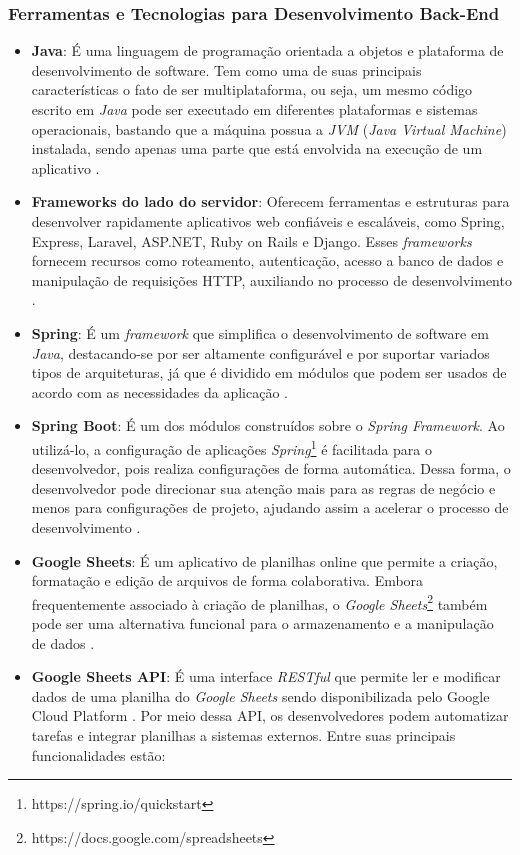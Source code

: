 \subsubsection{Ferramentas e Tecnologias para Desenvolvimento Back-End}

\begin{itemize}
    \item \textbf{Java}: É uma linguagem de programação orientada a objetos e plataforma de desenvolvimento de software. Tem como uma de suas principais características o fato de ser multiplataforma, ou seja, um mesmo código escrito em \textit{Java} pode ser executado em diferentes plataformas e sistemas operacionais, bastando que a máquina possua a \textit{JVM} (\textit{Java Virtual Machine}) instalada, sendo apenas uma parte que está envolvida na execução de um aplicativo \cite{Java2025}.
    \item \textbf{Frameworks do lado do servidor}: Oferecem ferramentas e estruturas para desenvolver rapidamente aplicativos web confiáveis e escaláveis, como Spring, Express, Laravel, ASP.NET, Ruby on Rails e Django. Esses \textit{frameworks} fornecem recursos como roteamento, autenticação, acesso a banco de dados e manipulação de requisições HTTP, auxiliando no processo de desenvolvimento \cite{santiago2020desenvolvimento}.
    \item \textbf{Spring}: É um \textit{framework} que simplifica o desenvolvimento de software em \textit{Java}, destacando-se por ser altamente configurável e por suportar variados tipos de arquiteturas, já que é dividido em módulos que podem ser usados de acordo com as necessidades da aplicação \cite{Spring2025}.
    \item \textbf{Spring Boot}: É um dos módulos construídos sobre o \textit{Spring Framework}. Ao utilizá-lo, a configuração de aplicações \textit{Spring}\footnote{https://spring.io/quickstart} é facilitada para o desenvolvedor, pois realiza configurações de forma automática. Dessa forma, o desenvolvedor pode direcionar sua atenção mais para as regras de negócio e menos para configurações de projeto, ajudando assim a acelerar o processo de desenvolvimento \cite{SpringBoot2025}.
    \item \textbf{Google Sheets}: É um aplicativo de planilhas online que permite a criação, formatação e edição de arquivos de forma colaborativa. Embora frequentemente associado à criação de planilhas, o \textit{Google Sheets}\footnote{https://docs.google.com/spreadsheets} também pode ser uma alternativa funcional para o armazenamento e a manipulação de dados \cite{ufsm2024}.
    \item \textbf{Google Sheets API}: É uma interface \textit{RESTful} que permite ler e modificar dados de uma planilha do \textit{Google Sheets} sendo disponibilizada pelo Google Cloud Platform \cite{apisheets2025}. Por meio dessa API, os desenvolvedores podem automatizar tarefas e integrar planilhas a sistemas externos. Entre suas principais funcionalidades estão:


\end{itemize}
